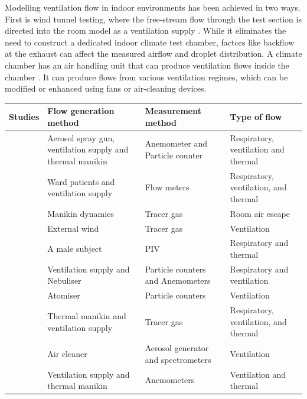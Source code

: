 \documentclass[a4paper,12pt]{elsarticle}
\begin{document}
Modelling ventilation flow in indoor environments has been achieved in two ways. First is wind tunnel testing, where the free-stream flow through the test section is directed into the room model as a ventilation supply \cite{motamedi2022cfd}. While it eliminates the need to construct a dedicated indoor climate test chamber, factors like backflow at the exhaust can affect the measured airflow and droplet distribution. A climate chamber has an air handling unit that can produce ventilation flows inside the chamber \cite{berrouk2010experimental,cheng2021experimental,lu2022ventilation,li2023numerical}. It can produce flows from various ventilation regimes, which can be modified or enhanced using fans or air-cleaning devices.

\begin{table}[h!]
    \centering
    \begin{tabular}{|m{4cm}|m{3.5cm}|m{3.5cm}|m{3.5cm}|}
    \hline
    \textbf{Studies} & \textbf{Flow generation method} & \textbf{Measurement method} & \textbf{Type of flow}\\
    \hline
    \citet{berrouk2010experimental}& Aerosol spray gun, ventilation supply and thermal manikin & Anemometer and Particle counter & Respiratory, ventilation and thermal\\
    \hline
    \citet{li2005role} & Ward patients and ventilation supply & Flow meters & Respiratory, ventilation, and thermal\\
    \hline
    \citet{saarinen2015large} & Manikin dynamics & Tracer gas & Room air escape \\
    \hline
    \citet{jiang2009investigating}& External wind & Tracer gas & Ventilation\\
    \hline
    \citet{faleiros2022tu}& A male subject & PIV & Respiratory and thermal\\
    \hline
    \citet{romano2015numerical}& Ventilation supply and Nebuliser & Particle counters and Anemometers & Respiratory and ventilation\\
    \hline
    \citet{quintero2022reducing}& Atomiser & Particle counters & Ventilation \\
    \hline
    \citet{hang2015potential}& Thermal manikin and ventilation supply & Tracer gas & Respiratory, ventilation, and thermal \\
    \hline
    \citet{jain2023numerical}& Air cleaner & Aerosol generator and spectrometers & Ventilation \\
    \hline
    \citet{li2023numerical}& Ventilation supply and thermal manikin & Anemometers  & Ventilation and thermal \\

\end{tabular}
\end{table}
\end{document}
